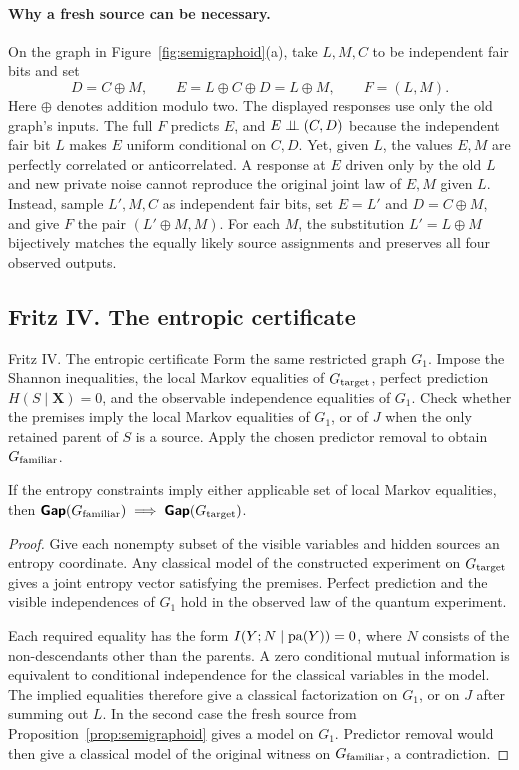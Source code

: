 \paragraph{Why a fresh source can be necessary.}
On the graph in Figure~\ref{fig:semigraphoid}(a), take \(L,M,C\) to be independent fair bits and set
\[
   D=C\oplus M,\qquad E=L\oplus C\oplus D=L\oplus M,\qquad F=(L,M).
\]
Here \(\oplus\) denotes addition modulo two. The displayed responses use only
the old graph's inputs. The full \(F\) predicts \(E\), and \(E\mathrel{\perp\!\!\!\perp}(C,D)\)
because the independent fair bit \(L\) makes \(E\) uniform conditional on
\(C,D\). Yet, given \(L\), the values \(E,M\) are perfectly correlated or
anticorrelated. A response at \(E\) driven only by the old \(L\) and new
private noise cannot reproduce the original joint law of \(E,M\)
given \(L\). Instead, sample \(L',M,C\) as independent fair bits, set
\(E=L'\) and \(D=C\oplus M\), and give \(F\) the pair \((L'\oplus M,M)\).
For each \(M\), the substitution \(L'=L\oplus M\) bijectively matches
the equally likely source assignments and preserves all four observed
outputs.

\subsection{Fritz IV. The entropic certificate}\label{sec:entropic}
\begin{piggyback}{Fritz IV. The entropic certificate}
Form the same restricted graph \(G_1\). Impose the Shannon inequalities,
the local Markov equalities of \(G_{\text{target}}\), perfect prediction
\(H(S\mid\mathbf X)=0\), and the observable independence equalities of
\(G_1\). Check whether the premises imply the local Markov equalities of
\(G_1\), or of \(J\) when the only retained parent of \(S\) is a source. Apply the
chosen predictor removal to obtain \(G_{\text{familiar}}\).
\end{piggyback}
\begin{proposition}\label{prop:entropic}
If the entropy constraints imply either applicable set of local
Markov equalities, then \(\operatorname{\text{\normalfont\sffamily\bfseries Gap}}(G_{\text{familiar}})\implies\operatorname{\text{\normalfont\sffamily\bfseries Gap}}(G_{\text{target}})\).
\end{proposition}
\begin{proof}
Give each nonempty subset of the visible variables and hidden sources an
entropy coordinate. Any classical model of the constructed experiment
on \(G_{\text{target}}\) gives a joint entropy vector satisfying the premises.
Perfect prediction and the visible independences of \(G_1\) hold in the
observed law of the quantum experiment.

Each required equality has the form \(I(Y;N\mid\operatorname{pa}(Y))=0\), where
\(N\) consists of the non-descendants other than the parents. A zero
conditional mutual information is equivalent to conditional
independence for the classical variables in the model. The implied
equalities therefore give a classical factorization on \(G_1\), or on
\(J\) after summing out \(L\). In the second case the fresh source
from Proposition~\ref{prop:semigraphoid} gives a model on \(G_1\).
Predictor removal would then give a classical model of the original
witness on \(G_{\text{familiar}}\), a contradiction.
\end{proof}

